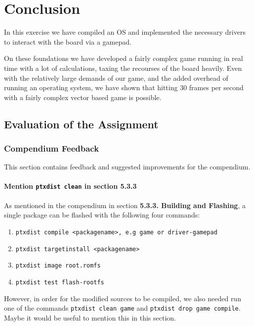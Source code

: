 \chapter{Conclusion}
In this exercise we have compiled an OS and implemented the necessary drivers to interact with the board via a gamepad. 

On these foundations we have developed a fairly complex game running in real time with a lot of calculations, taxing the recourses of the board heavily. Even with the relatively large demands of our game, and the added overhead of running an operating system, we have shown that hitting 30 frames per second with a fairly complex vector based game is possible.

\section{Evaluation of the Assignment}

\subsection{Compendium Feedback}
This section contains feedback and suggested improvements for the compendium.

\subsubsection{Mention \texttt{ptxdist clean} in section 5.3.3}
As mentioned in the compendium in section \textbf{5.3.3. Building and Flashing}, a single package can be flashed with the following four commands:
\begin{enumerate}
  \item \texttt{ptxdist compile <packagename>, e.g game or driver-gamepad}
  \item \texttt{ptxdist targetinstall <packagename>}
  \item \texttt{ptxdist image root.romfs}
  \item \texttt{ptxdist test flash-rootfs}
\end{enumerate}
However, in order for the modified sources to be compiled, we also needed run one of the commands \texttt{ptxdist clean game} and \texttt{ptxdist drop game compile}. Maybe it would be useful to mention this in this section.

